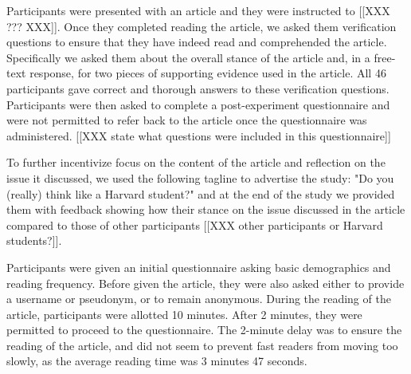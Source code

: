 Participants were presented with an article and they were instructed to [[XXX ??? XXX]].  Once they completed reading the article, we asked them verification questions to ensure that they have indeed read and comprehended the article.  Specifically we asked them about the overall stance of the article and, in a free-text response, for two pieces of supporting evidence used in the article.  All 46 participants gave correct and thorough answers to these verification questions.  Participants were then asked to complete a post-experiment questionnaire and were not permitted to refer back to the article once the questionnaire was administered. [[XXX state what questions were included in this questionnaire]]

To further incentivize focus on the content of the article and reflection on the issue it discussed, we used the following tagline to advertise the study: "Do you (really) think like a Harvard student?" and at the end of the study we provided them with feedback showing how their stance on the issue discussed in the article compared to those of other participants [[XXX other participants or Harvard students?]].

%

Participants were given an initial questionnaire asking basic demographics and reading frequency. Before given the article, they were also asked either to provide a username or pseudonym, or to remain anonymous. During the reading of the article, participants were allotted 10 minutes. After 2 minutes, they were permitted to proceed to the questionnaire. The 2-minute delay was to ensure the reading of the article, and did not seem to prevent fast readers from moving too slowly, as the average reading time was 3 minutes 47 seconds. 

